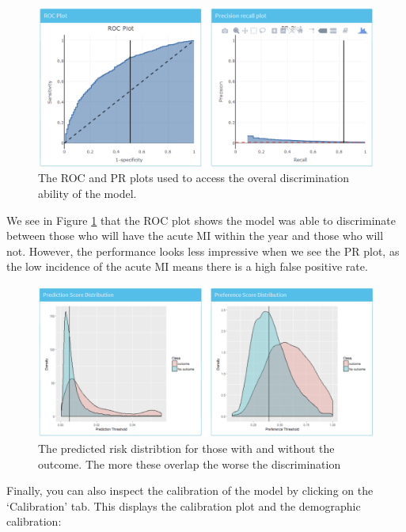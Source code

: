 \documentclass[11pt]{book}
\begin{document}
\begin{figure}

{\centering \includegraphics[width=0.8\linewidth]{images/PatientLevelPrediction/shiny/shinyPerformanceDisc} 

}

\caption{The ROC and PR plots used to access the overal discrimination ability of the model.}\label{fig:shinyPerformanceDisc}
\end{figure}

We see in Figure \ref{fig:shinyPerformanceDisc} that the ROC plot shows
the model was able to discriminate between those who will have the acute
MI within the year and those who will not. However, the performance
looks less impressive when we see the PR plot, as the low incidence of
the acute MI means there is a high false positive rate.

\begin{figure}

{\centering \includegraphics[width=0.8\linewidth]{images/PatientLevelPrediction/shiny/shinyPerformanceDist} 

}

\caption{The predicted risk distribtion for those with and without the outcome.  The more these overlap the worse the discrimination}\label{fig:shinyPerformanceDist}
\end{figure}

Finally, you can also inspect the calibration of the model by clicking
on the `Calibration' tab. This displays the calibration plot and the
demographic calibration:
\end{document}
